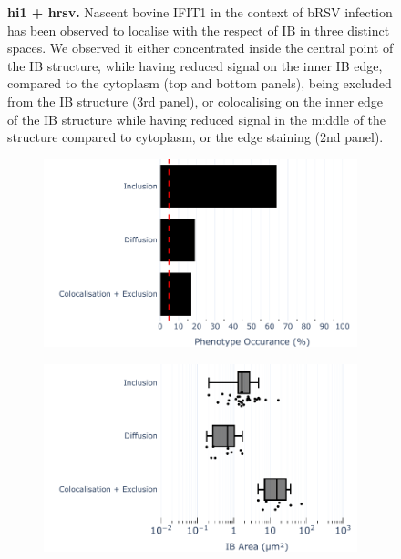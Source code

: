 \begin{figure}
\begin{subfigure}{1\textwidth}
    \end{subfigure}
    \caption[hi1 + hrsv]{\textbf{hi1 + hrsv.} Nascent bovine IFIT1 in the context of bRSV infection has been observed to localise with the respect of IB in three distinct spaces. We observed it either concentrated inside the central point of the IB structure, while having reduced signal on the inner IB edge, compared to the cytoplasm (top and bottom panels), being excluded from the IB structure (3rd panel), or colocalising on the inner edge of the IB structure while having reduced signal in the middle of the structure compared to cytoplasm, or the edge staining (2nd panel).}
    \label{fig:hi1 + hrsv}
\end{figure}

\begin{figure}
    \begin{subfigure}{0.5\textwidth}
        \caption{}
        \includegraphics[width=1\linewidth]{09. Chapter 4/Figs/04. Overexpression/01. IFIT1/04. bar_i1_brsv.pdf} 
    \end{subfigure}
    \begin{subfigure}{0.5\textwidth}
        \caption{}
        \includegraphics[width=1\linewidth]{09. Chapter 4/Figs/04. Overexpression/01. IFIT1/05. box_i1_brsv.pdf}

\end{subfigure}
\end{figure}

